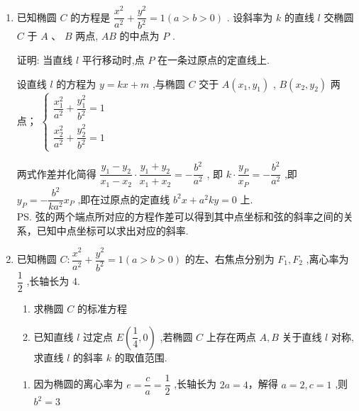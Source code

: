 \begin{enumerate}
\begin{enumerate}
\begin{jieda}
\begin{enumerate}
                因为 ${AB}$ 的中点坐标为(-2,1)在椭圆内部,所以 $\dfrac{{y}_{1} - {y}_{2}}{{x}_{1} - {x}_{2}} = 1$ ,所以直线 $l$ 的斜率为 1，故直线 $l$ 的方程为 $y - 1 = x + 2$ ,即 $x - y + 3 = 0$ .
            \end{enumerate}
        \end{jieda}

        \item 已知椭圆 $C$ 的方程是 $\dfrac{{x}^{2}}{{a}^{2}} + \dfrac{{y}^{2}}{{b}^{2}} = 1\left( {a > b > 0}\right)$ . 设斜率为 $k$ 的直线 $l$ 交椭圆 $C$ 于 $A\text{ 、 }B$ 两点, ${AB}$ 的中点为 $P$ . 
        
        证明: 当直线 $l$ 平行移动时,点 $P$ 在一条过原点的定直线上.
        \begin{jieda}
            设直线 $ l $ 的方程为 $ y = {kx} + m $ ,与椭圆 $ C $ 交于 $ A\left( {{x}_{1},{y}_{1}}\right) $ , $ B\left( {{x}_{2},{y}_{2}}\right) $ 两点；
            $ \left\{  \begin{array}{l} \dfrac{{x}_{1}^2}{{a}^{2}} + \dfrac{{y}_{1}^{2}}{{b}^{2}} = 1 \\  \dfrac{{x}_{2}^2}{{a}^{2}} + \dfrac{{y}_{2}^{2}}{{b}^{2}} = 1 \end{array}\right. $
            
            两式作差并化简得 $ \dfrac{{y}_{1} - {y}_{2}}{{x}_{1} - {x}_{2}} \cdot  \dfrac{{y}_{1} + {y}_{2}}{{x}_{1} + {x}_{2}} =  - \dfrac{{b}^{2}}{{a}^{2}} $ ,
            即 $ k \cdot  \dfrac{{y}_P}{{x}_P} =  - \dfrac{{b}^{2}}{{a}^{2}} $ ,即 $ {y}_P =  - \dfrac{{b}^{2}}{k{a}^{2}}{x}_P $ ,即在过原点的定直线 $ {b}^{2}x + {a}^{2}{ky} = 0 $ 上. \\
            \ps 弦的两个端点所对应的方程作差可以得到其中点坐标和弦的斜率之间的关系，已知中点坐标可以求出对应的斜率.
        \end{jieda}
            
        \item 已知椭圆 $C : \dfrac{{x}^{2}}{{a}^{2}} + \dfrac{{y}^{2}}{{b}^{2}} = 1\left( {a > b > 0}\right)$ 的左、右焦点分别为 ${F}_{1},{F}_{2}$ ,离心率为 $\dfrac{1}{2}$ ,长轴长为 4.
        \begin{enumerate}
            \item 求椭圆 $C$ 的标准方程
            \item 已知直线 $l$ 过定点 $E\left( {\dfrac{1}{4},0}\right)$ ,若椭圆 $C$ 上存在两点 $A,B$ 关于直线 $l$ 对称,求直线 $l$ 的斜率 $k$ 的取值范围.
        \end{enumerate}
        \begin{jieda}
            \begin{enumerate}
                \item 因为椭圆的离心率为 $e = \dfrac{c}{a} = \dfrac{1}{2}$ ,长轴长为 ${2a} = 4$，解得 $a = 2,c = 1$ ,则 ${b}^{2} = 3$
                

\end{enumerate}
\end{jieda}
\end{enumerate}
\end{enumerate}
